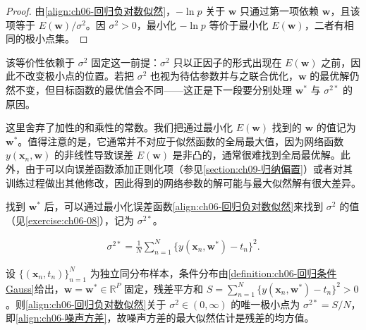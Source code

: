 \documentclass[../../main.tex]{subfiles}
\begin{document}
\begin{proof}
由\eqref{align:ch06-回归负对数似然}，$-\ln p$ 关于 $\boldsymbol{w}$ 只通过第一项依赖 $\boldsymbol{w}$，且该项等于 $E(\boldsymbol{w})/\sigma^{2}$。因 $\sigma^{2}>0$，最小化 $-\ln p$ 等价于最小化 $E(\boldsymbol{w})$，二者有相同的极小点集。
\end{proof}

\begin{remark}该等价性依赖于 $\sigma^{2}$ 固定这一前提：$\sigma^{2}$ 只以正因子的形式出现在 $E(\boldsymbol{w})$ 之前，因此不改变极小点的位置。若把 $\sigma^{2}$ 也视为待估参数并与之联合优化，$\boldsymbol{w}$ 的最优解仍然不变，但目标函数的最优值会不同——这正是下一段要分别处理 $\boldsymbol{w}^{\ast}$ 与 $\sigma^{2\ast}$ 的原因。
\end{remark}

这里舍弃了加性的和乘性的常数。我们把通过最小化 $E(\boldsymbol{w})$ 找到的 $\boldsymbol{w}$ 的值记为 $\boldsymbol{w}^{\ast}$。值得注意的是，它通常并不对应于似然函数的全局最大值，因为网络函数 $y(\boldsymbol{x}_n,\boldsymbol{w})$ 的非线性导致误差 $E(\boldsymbol{w})$ 是非凸的，通常很难找到全局最优解。此外，由于可以向误差函数添加正则化项（参见\cref{section:ch09-归纳偏置}）或者对其训练过程做出其他修改，因此得到的网络参数的解可能与最大似然解有很大差异。

找到 $\boldsymbol{w}^{\ast}$ 后，可以通过最小化误差函数\eqref{align:ch06-回归负对数似然}来找到 $\sigma^{2}$ 的值（见\cref{exercise:ch06-08}），记为 $\sigma^{2\ast}$。

\begin{align}
\sigma^{2\ast}=\frac{1}{N}\sum_{n=1}^{N}\bigl\{y(\boldsymbol{x}_n,\boldsymbol{w}^{\ast})-t_n\bigr\}^{2}.
\label{align:ch06-噪声方差}
\end{align}

\begin{proposition}[噪声方差的最大似然解]\label{proposition:ch06-噪声方差估计}
设 $\{(\boldsymbol{x}_{n},t_{n})\}_{n=1}^{N}$ 为独立同分布样本，条件分布由\cref{definition:ch06-回归条件Gauss}给出，$\boldsymbol{w}=\boldsymbol{w}^{\ast}\in\mathbb{R}^{P}$ 固定，残差平方和 $S=\sum_{n=1}^{N}\{y(\boldsymbol{x}_{n},\boldsymbol{w}^{\ast})-t_{n}\}^{2}>0$。则\eqref{align:ch06-回归负对数似然}关于 $\sigma^{2}\in(0,\infty)$ 的唯一极小点为 $\sigma^{2\ast}=S/N$，即\eqref{align:ch06-噪声方差}，故噪声方差的最大似然估计是残差的均方值。
\end{proposition}
\end{document}
